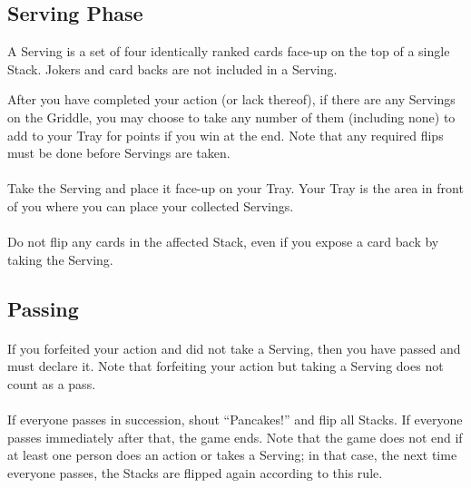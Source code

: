 \documentclass{article}
\begin{document}
\subsection{Serving Phase}
\label{sec:servingphase}

A Serving is a set of four identically ranked cards face-up on the top of a single Stack. Jokers and card backs are not included in a Serving.

After you have completed your action (or lack thereof), if there are any Servings on the Griddle, you may choose to take any number of them (including none) to add to your Tray for points if you win at the end. Note that any required flips must be done before Servings are taken.

\paragraph{} \label{par:takeserving}
Take the Serving and place it face-up on your Tray. Your Tray is the area in front of you where you can place your collected Servings.

\paragraph{} \label{par:servingexpose}
Do not flip any cards in the affected Stack, even if you expose a card back by taking the Serving.

\subsection{Passing}
\label{sec:passing}

\paragraph{} \label{par:passdef}
If you forfeited your action and did not take a Serving, then you have passed and must declare it. Note that forfeiting your action but taking a Serving does not count as a pass.

\paragraph{} \label{par:pancakeflip}
If everyone passes in succession, shout ``Pancakes!'' and flip all Stacks. If everyone passes immediately after that, the game ends. Note that the game does not end if at least one person does an action or takes a Serving; in that case, the next time everyone passes, the Stacks are flipped again according to this rule.
\end{document}
